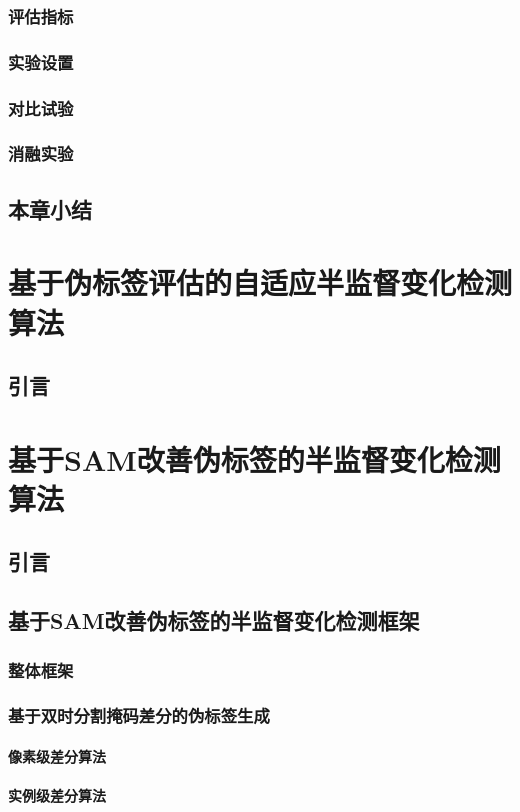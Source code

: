 \documentclass[lang=chs, degree=master, blindreview=false, adobe=false]{yanputhesis}
\begin{document}
\subsection{评估指标}
\subsection{实验设置}
\subsection{对比试验}
\subsection{消融实验}
\section{本章小结}
\chapter{基于伪标签评估的自适应半监督变化检测算法}
\section{引言}


\chapter{基于SAM改善伪标签的半监督变化检测算法}
\section{引言}
\section{基于SAM改善伪标签的半监督变化检测框架}
\subsection{整体框架}
\subsection{基于双时分割掩码差分的伪标签生成}
\subsubsection{像素级差分算法}
\subsubsection{实例级差分算法}
\end{document}
